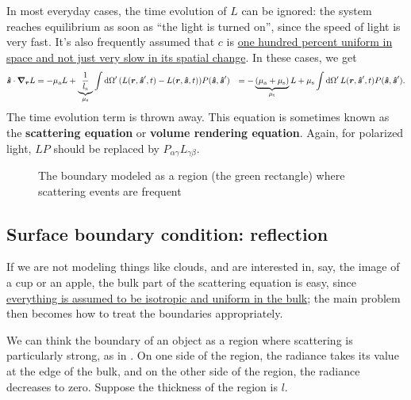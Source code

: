 \documentclass[hyperref, a4paper]{article}
\newcommand*{\concept}[1]{{\textbf{#1}}}
\def\\{}%
\begin{document}
In most everyday cases, the time evolution of $L$ can be ignored: 
the system reaches equilibrium as soon as ``the light is turned on'', 
since the speed of light is very fast. 
It's also frequently assumed that $c$ is 
\ul{one hundred percent uniform in space
and not just very slow in its spatial change}. 
In these cases, we get 
\begin{equation}
    \begin{aligned}
        \vu*{s} \cdot \grad_{\vb*{r}} L &= 
        - \mu_{\text{a}} L +
        \underbrace{\frac{1}{l_{\text{s}}}}_{\mu_{\text{s}}} \int \dd{\Omega'} 
        (L(\vb*{r}, \vu*{s}', t) - L(\vb*{r}, \vu*{s}, t)) P(\vu*{s}, \vu*{s}') \\
        &= - \underbrace{(\mu_{\text{a}} + \mu_{\text{s}})}_{\mu_{\text{t}}} L 
        + \mu_{\text{s}} \int \dd{\Omega'} 
        L(\vb*{r}, \vu*{s}', t) P(\vu*{s}, \vu*{s}') .
    \end{aligned}
    \label{eq:se-final}
\end{equation}
The time evolution term is thrown away. 
This equation is sometimes known as the \concept{scattering equation}
or \concept{volume rendering equation}.
Again, for polarized light, $L P$ should be replaced by $P_{\alpha \gamma} L_{\gamma \beta}$.

\begin{figure}
    \centering
    
    \caption{The boundary modeled as a region (the green rectangle) where scattering events are frequent}
    \label{fig:boundary-scattering}
\end{figure}

\subsection{Surface boundary condition: reflection}

If we are not modeling things like clouds, 
and are interested in, say, the image of a cup or an apple, 
the bulk part of the scattering equation is easy, 
since \ul{everything is assumed to be isotropic and uniform in the bulk};
the main problem then becomes how to treat the boundaries appropriately.

We can think the boundary of an object as a region where 
scattering is particularly strong, 
as in .
On one side of the region, 
the radiance takes its value at the edge of the bulk, 
and on the other side of the region, 
the radiance decreases to zero. 
Suppose the thickness of the region is $l$.
\end{document}
